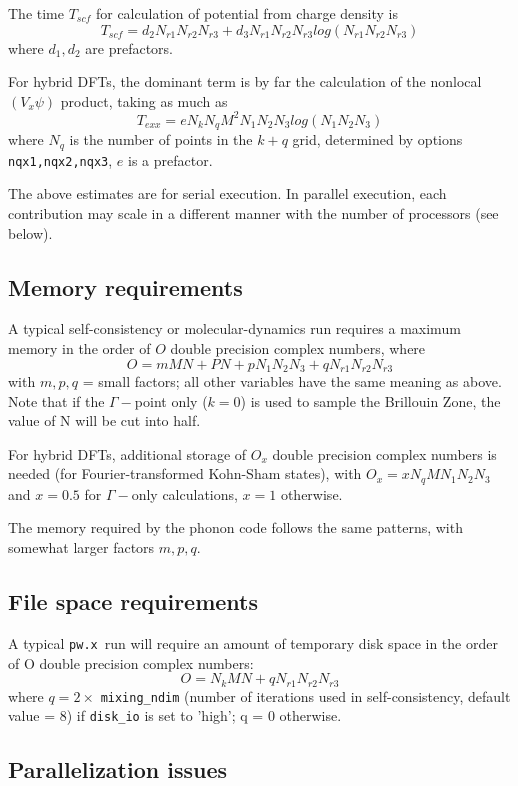 \documentclass[12pt,a4paper]{article}
\def\pwx{\texttt{pw.x}}
\begin{document}
The time $T_{scf}$ for calculation of potential from charge density is
$$T_{scf} = d_2 N_{r1} N_{r2} N_{r3} + d_3 N_{r1} N_{r2} N_{r3} 
            log(N_{r1} N_{r2} N_{r3} )$$
where $d_1, d_2$ are prefactors.

For hybrid DFTs, the dominant term is by far the calculation of the 
nonlocal $(V_x\psi)$ product, taking as much as
$$T_{exx} = e N_k N_q M^2 N_1 N_2N_3 log(N_1 N_2 N_3)$$
where $N_q$ is the number of points in the $k+q$ grid, determined by
options \texttt{nqx1,nqx2,nqx3}, $e$ is a prefactor.

The above estimates are for serial execution. In parallel execution,
each contribution may scale in a different manner with the number of processors (see below).

\subsection{Memory requirements}

A typical self-consistency or molecular-dynamics run requires a maximum
memory in the order of $O$ double precision complex numbers, where
$$ O = m M N + P N + p N_1 N_2 N_3 + q N_{r1} N_{r2} N_{r3}$$
with $m, p, q$ = small factors; all other variables have the same meaning as
above. Note that if the $\Gamma-$point only ($k=0$) is used to sample the 
Brillouin Zone, the value of N will be cut into half.

For hybrid DFTs, additional storage of $O_x$ double precision complex 
numbers is needed (for Fourier-transformed Kohn-Sham states), with
$O_x = x N_q M N_1N_2N_3$ and $x=0.5$ for $\Gamma-$only 
calculations, $x=1$ otherwise.

The memory required by the phonon code follows the same patterns, with
somewhat larger factors $m, p, q$.

\subsection{File space requirements}

A typical \pwx\ run will require an amount of temporary disk space in the
order of O double precision complex numbers:
$$O = N_k M N + q N_{r1} N_{r2}N_{r3}$$
where $q = 2\times$ \texttt{mixing\_ndim} (number of iterations used in 
self-consistency, default value = 8) if \texttt{disk\_io} is set to 'high'; q = 0 
otherwise.

\subsection{Parallelization issues}
\label{SubSec:badpara}
\end{document}
